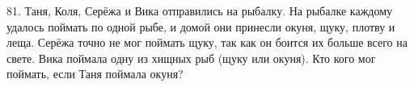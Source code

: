 81. Таня, Коля, Серёжа и Вика отправились на рыбалку. На рыбалке каждому удалось поймать по одной рыбе, и домой они принесли окуня, щуку, плотву и леща. Серёжа точно не мог поймать щуку, так как он боится их больше всего на свете. Вика поймала одну из хищных рыб (щуку или окуня). Кто кого мог поймать, если Таня поймала окуня?\\
